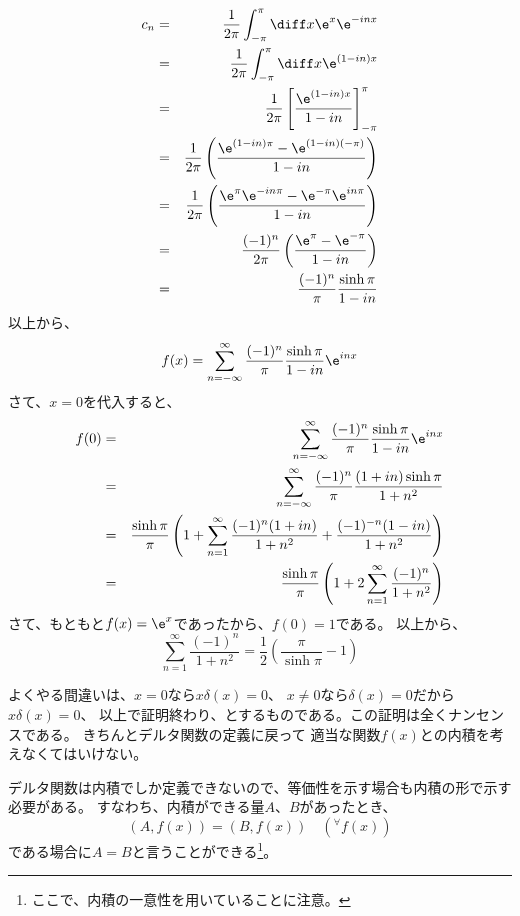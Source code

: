 
\begin{eqnarray}
  c_n &=& \frac{1}{2\pi} \int_{-\pi}^{\pi} \diff x \e^x \e^{-inx} \\
  &=& \frac{1}{2\pi} \int_{-\pi}^{\pi} \diff x \e^{(1-in)x} \\
  &=& \frac{1}{2\pi} \left[ \frac{\e^{(1-in)x}}{1-in}  \right]_{-\pi}^{\pi}\\
  &=& \frac{1}{2\pi} \left( \frac{\e^{(1-in)\pi} - \e^{(1-in)(-\pi) }}{1-in}  \right)\\
  &=& \frac{1}{2\pi} \left( \frac{ \e^\pi \e^{-in\pi} - \e^{-\pi} \e^{in\pi} }{1-in}  \right)\\
  &=& \frac{(-1)^n}{2\pi} \left( \frac{\e^{\pi} - \e^{-\pi} }{1-in}  \right)\\
  &=& \frac{(-1)^n}{\pi} \frac{\sinh \pi }{1-in}
\end{eqnarray}
以上から、
\begin{equation}
  f(x) = \sum_{n=-\infty}^{\infty} \frac{(-1)^n}{\pi} \frac{\sinh \pi }{1-in} \e^{inx}
\end{equation}
さて、$x=0$を代入すると、
\begin{eqnarray}
  f(0) &=& \sum_{n=-\infty}^{\infty} \frac{(-1)^n}{\pi} \frac{\sinh \pi }{1-in} \e^{inx}\\
  &=& \sum_{n=-\infty}^{\infty} \frac{(-1)^n}{\pi} \frac{(1+in) \sinh \pi }{1+n^2}\\
  &=& \frac{\sinh \pi}{\pi}\left( 1+  \sum_{n=1}^{\infty}\frac{(-1)^n(1+in)}{1+n^2}+\frac{(-1)^{-n}(1-in)}{1+n^2}  \right)\\
  &=& \frac{\sinh \pi}{\pi}\left( 1+  2 \sum_{n=1}^{\infty} \frac{(-1)^n}{1+n^2} \right)
\end{eqnarray}
さて、もともと$f(x)=\e^x$であったから、$f(0)=1$である。
以上から、
\begin{equation}
  \sum_{n=1}^{\infty} \frac{(-1)^n}{1+n^2} = \frac{1}{2} \left( \frac{\pi}{\sinh \pi} -1 \right)
\end{equation}

よくやる間違いは、$x = 0$なら$x \delta(x) = 0$、
$x \neq 0$なら$\delta(x) = 0$だから$x \delta(x) = 0$、
以上で証明終わり、とするものである。この証明は全くナンセンスである。
きちんとデルタ関数の定義に戻って
適当な関数$f(x)$との内積を考えなくてはいけない。

デルタ関数は内積でしか定義できないので、等価性を示す場合も内積の形で示す必要がある。
すなわち、内積ができる量$A$、$B$があったとき、
\begin{equation}
  (A,f(x)) = (B,f(x)) \quad \left( ^\forall f(x) \right)
\end{equation}
である場合に$A=B$と言うことができる\footnote{%
  ここで、内積の一意性を用いていることに注意。
}。

